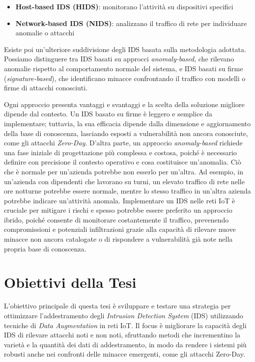 \begin{itemize}
    \item \textbf{Host-based IDS (HIDS)}: monitorano l'attività su dispositivi specifici
    \item \textbf{Network-based IDS (NIDS)}: analizzano il traffico di rete per individuare anomalie o attacchi
\end{itemize}
Esiste poi un'ulteriore suddivisione degli IDS basata sulla metodologia adottata. Possiamo distinguere tra IDS basati su approcci \textit{anomaly-based}, che rilevano anomalie rispetto al comportamento normale del sistema, e IDS basati su firme (\textit{signature-based}), che identificano minacce confrontando il traffico con modelli o firme di attacchi conosciuti.

Ogni approccio presenta vantaggi e svantaggi e la scelta della soluzione migliore dipende dal contesto. Un IDS basato su firme è leggero e semplice da implementare; tuttavia, la sua efficacia dipende dalla dimensione e aggiornamento della base di conoscenza, lasciando esposti a vulnerabilità non ancora conosciute, come gli attacchi \textit{Zero-Day}. D'altra parte, un approccio \textit{anomaly-based} richiede una fase iniziale di progettazione più complessa e costosa, poiché è necessario definire con precisione il contesto operativo e cosa costituisce un'anomalia. Ciò che è normale per un'azienda potrebbe non esserlo per un'altra. Ad esempio, in un'azienda con dipendenti che lavorano su turni, un elevato traffico di rete nelle ore notturne potrebbe essere normale, mentre lo stesso traffico in un'altra azienda potrebbe indicare un'attività anomala. \cite{Ids_Iot}
Implementare un IDS nelle reti IoT è cruciale per mitigare i rischi e spesso potrebbe essere preferito un approccio ibrido, poiché consente di monitorare costantemente il traffico, prevenendo compromissioni e potenziali infiltrazioni grazie alla capacità di rilevare nuove minacce non ancora catalogate o di rispondere a vulnerabilità già note nella propria base di conoscenza.

\section{Obiettivi della Tesi}

L'obiettivo principale di questa tesi è sviluppare e testare una strategia per ottimizzare l'addestramento degli \textit{Intrusion Detection System} (IDS) utilizzando tecniche di \textit{Data Augmentation} in reti IoT. Il focus è migliorare la capacità degli IDS di rilevare attacchi noti e non noti, sfruttando metodi che incrementino la varietà e la quantità dei dati di addestramento, in modo da rendere i sistemi più robusti anche nei confronti delle minacce emergenti, come gli attacchi Zero-Day.


